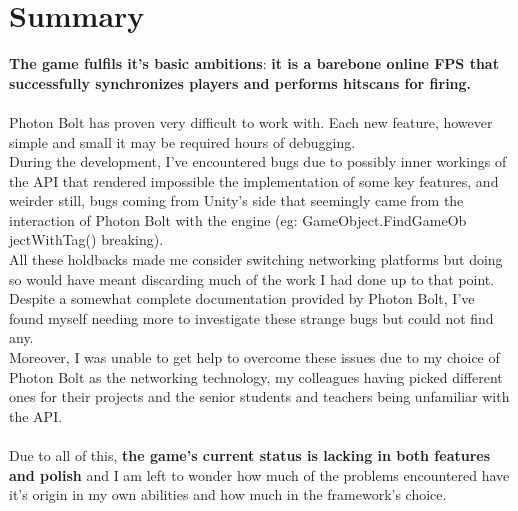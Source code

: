 \documentclass[12pt,a4paper]{article}
\begin{document}
\section{Summary}
\textbf{The game fulfils it's basic ambitions}: \textbf{it is a barebone online FPS that successfully synchronizes players and performs hitscans for firing.}\\\\
Photon Bolt has proven very difficult to work with. Each new feature, however simple and small it may be required hours of debugging.\\
During the development, I've encountered bugs due to possibly inner workings of the API that rendered impossible the implementation of some key features, and weirder still, bugs coming from Unity's side that seemingly came from the interaction of Photon Bolt with the engine (eg: GameObject.FindGameOb\\jectWithTag() breaking).\\
All these holdbacks made me consider switching networking platforms but doing so would have meant discarding much of the work I had done up to that point.\\
Despite a somewhat complete documentation provided by Photon Bolt, I've found myself needing more to investigate these strange bugs but could not find any.\\
Moreover, I was unable to get help to overcome these issues due to my choice of Photon Bolt as the networking technology, my colleagues having picked different ones for their projects and the senior students and teachers being unfamiliar with the API.\\\\
Due to all of this, \textbf{the game's current status is lacking in both features and polish} and I am left to wonder how much of the problems encountered have it's origin in my own abilities and how much in the framework's choice.
\end{document}
